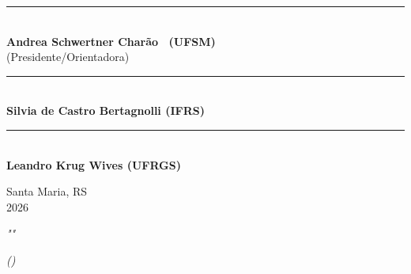\documentclass[
	article,			%
	12pt,				%
	oneside,			%
	a4paper,			%
	chapter=TITLE,		%
	section=TITLE,		%
	english,			%
	brazil,				%
    sumario=tradicional
	]{abntex2}
\newcommand{\MyLocation}{Santa Maria, RS}
\newcommand{\MyAdvisorName}{Andrea Schwertner Charão}
\newcommand{\MyAdvisorCommitteeRole}{(Presidente/Orientadora)}
\newcommand{\MyFirstExaminer}{Silvia de Castro Bertagnolli (IFRS)}
\newcommand{\MySecondExaminer}{Leandro Krug Wives (UFRGS)}
\newcommand{\MyYear}{2026}
\begin{document}
      \SingleSpacing
      \vspace{0.25\baselineskip}
       \begin{center}

      \SingleSpacing
      \vspace{2.0\baselineskip}




         \if@orientador
         \fi

        \vspace{1.0\baselineskip}
        \noindent\rule{0.5\textwidth}{1.pt}\\
        \noindent\textbf{\MyAdvisorName~ (UFSM)}\\
        \MyAdvisorCommitteeRole

        \vspace{1.0\baselineskip}
        \noindent\rule{0.5\textwidth}{1.pt}\\
        \noindent\textbf{\MyFirstExaminer}\\
        
        \vspace{1.0\baselineskip}
        \noindent\rule{0.5\textwidth}{1.pt}\\
        \noindent\textbf{\MySecondExaminer}\\
       
       
         \vspace{\fill}

         \MyLocation\\
         \MyYear
         \end{center}
         

\newpage

\begin{KeepFromToc}

\begin{center}
\end{center}

\newpage



\setlength{\parskip}{0.0cm}
      \vspace*{\fill}
      \begin{flushright}
      \begin{minipage}{0.45\textwidth}
      \textit{""}      
      \begin{flushright}\footnotesize{\textit{()}}\end{flushright}
      \end{minipage}
      \end{flushright}
      
\end{KeepFromToc}
\end{document}
